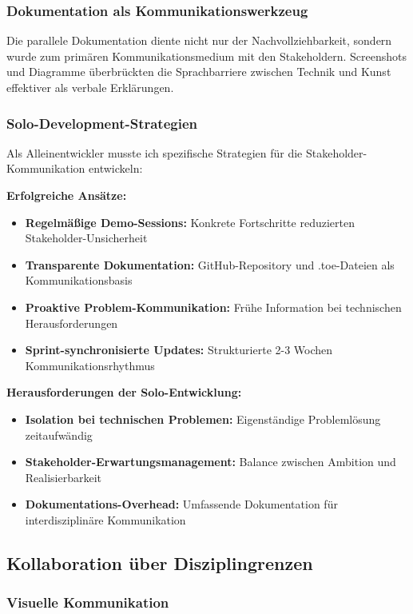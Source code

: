 \subsubsection{Dokumentation als Kommunikationswerkzeug}

Die parallele Dokumentation diente nicht nur der Nachvollziehbarkeit, sondern wurde zum primären Kommunikationsmedium mit den Stakeholdern. Screenshots und Diagramme überbrückten die Sprachbarriere zwischen Technik und Kunst effektiver als verbale Erklärungen.

\subsubsection{Solo-Development-Strategien}

Als Alleinentwickler musste ich spezifische Strategien für die Stakeholder-Kommunikation entwickeln:

\textbf{Erfolgreiche Ansätze:}
\begin{itemize}
\item \textbf{Regelmäßige Demo-Sessions:} Konkrete Fortschritte reduzierten Stakeholder-Unsicherheit
\item \textbf{Transparente Dokumentation:} GitHub-Repository und .toe-Dateien als Kommunikationsbasis
\item \textbf{Proaktive Problem-Kommunikation:} Frühe Information bei technischen Herausforderungen
\item \textbf{Sprint-synchronisierte Updates:} Strukturierte 2-3 Wochen Kommunikationsrhythmus
\end{itemize}

\textbf{Herausforderungen der Solo-Entwicklung:}
\begin{itemize}
\item \textbf{Isolation bei technischen Problemen:} Eigenständige Problemlösung zeitaufwändig
\item \textbf{Stakeholder-Erwartungsmanagement:} Balance zwischen Ambition und Realisierbarkeit
\item \textbf{Dokumentations-Overhead:} Umfassende Dokumentation für interdisziplinäre Kommunikation
\end{itemize}

\subsection{Kollaboration über Disziplingrenzen}

\subsubsection{Visuelle Kommunikation}

